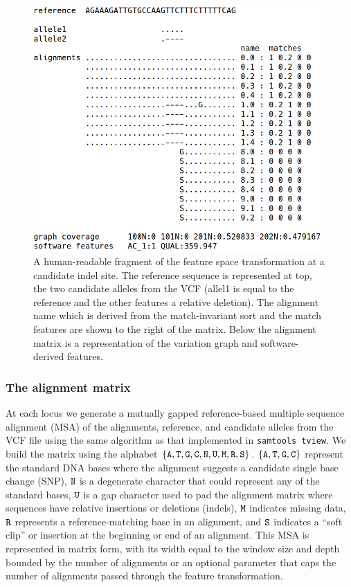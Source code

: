 \documentclass{article}
\begin{document}
\begin{figure}[t]
\centering
\includegraphics[width=1.0\textwidth]{indel}
\caption{\label{fig:indel}
  A human-readable fragment of the feature space transformation at a candidate indel site.
  The reference sequence is represented at top, the two candidate alleles from the VCF (allel1 is equal to the reference and the other features a relative deletion).
  The alignment name which is derived from the match-invariant sort and the match features are shown to the right of the matrix.
  Below the alignment matrix is a representation of the variation graph and software-derived features.
}
\end{figure}

\subsubsection{The alignment matrix}


At each locus we generate a mutually gapped reference-based multiple sequence alignment (MSA) of the alignments, reference, and candidate alleles from the VCF file using the same algorithm as that implemented in {\tt samtools tview}.
We build the matrix using the alphabet $\{ {\tt A, T, G, C, N, U, M, R, S} \}$.
$\{ {\tt A, T, G, C} \}$ represent the standard DNA bases where the alignment suggests a candidate single base change (SNP), ${\tt N}$ is a degenerate character that could represent any of the standard bases, ${\tt U}$ is a gap character used to pad the alignment matrix where sequences have relative insertions or deletions (indels), ${\tt M }$ indicates missing data, ${\tt R}$ represents a reference-matching base in an alignment, and ${\tt S}$ indicates a ``soft clip'' or insertion at the beginning or end of an alignment.
This MSA is represented in matrix form, with its width equal to the window size and depth bounded by the number of alignments or an optional parameter that caps the number of alignments passed through the feature transformation.
\end{document}
